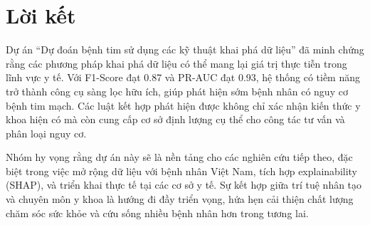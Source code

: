 \section{Lời kết}

Dự án ``Dự đoán bệnh tim sử dụng các kỹ thuật khai phá dữ liệu'' đã minh chứng rằng các phương pháp khai phá dữ liệu có thể mang lại giá trị thực tiễn trong lĩnh vực y tế. Với F1-Score đạt 0.87 và PR-AUC đạt 0.93, hệ thống có tiềm năng trở thành công cụ sàng lọc hữu ích, giúp phát hiện sớm bệnh nhân có nguy cơ bệnh tim mạch. Các luật kết hợp phát hiện được không chỉ xác nhận kiến thức y khoa hiện có mà còn cung cấp cơ sở định lượng cụ thể cho công tác tư vấn và phân loại nguy cơ.

Nhóm hy vọng rằng dự án này sẽ là nền tảng cho các nghiên cứu tiếp theo, đặc biệt trong việc mở rộng dữ liệu với bệnh nhân Việt Nam, tích hợp explainability (SHAP), và triển khai thực tế tại các cơ sở y tế. Sự kết hợp giữa trí tuệ nhân tạo và chuyên môn y khoa là hướng đi đầy triển vọng, hứa hẹn cải thiện chất lượng chăm sóc sức khỏe và cứu sống nhiều bệnh nhân hơn trong tương lai.
